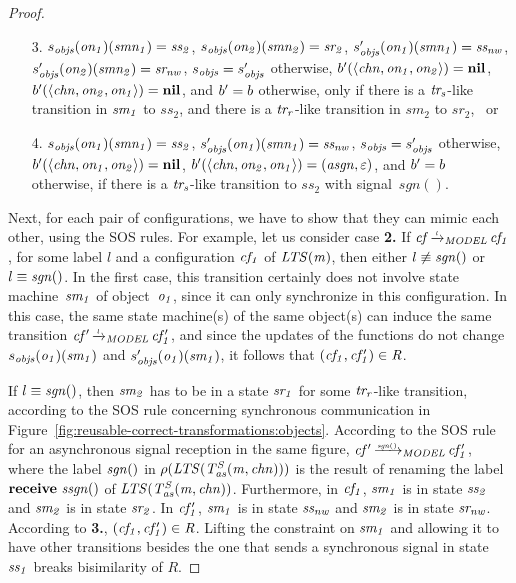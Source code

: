 \begin{proof}
\begin{enumerate}
\item[3.]
 $s_{\it{objs}}(\it{on_1})(\it{smn_1}) = \it{ss_2}$,
 $s_{\it{objs}}(\it{on_2})(\it{smn_2}) = \it{sr_2}$,
 $s_{\it{objs}}'(\it{on_1})(\it{smn_1}) = \it{ss_{nw}}$, \\
 $s_{\it{objs}}'(\it{on_2})(\it{smn_2}) = \it{sr_{nw}}$,
 $s_{\it{objs}} = s_{\it{objs}}'$ otherwise,
 $b'(\langle \it{chn}, \it{on_1}, \it{on_2}\rangle) = \mathbf{nil}$, \\
 $b'(\langle \it{chn}, \it{on_2}, \it{on_1}\rangle) = \mathbf{nil}$,
 and $b' = b$ otherwise,
 only if there is a $\it{tr_s}$-like transition in $\it{sm_1}$ to $ss_2$, and there is a $\it{tr_r}$-like transition in $sm_2$ to $sr_2$, \ or

\item[4.]
 $s_{\it{objs}}(\it{on_1})(\it{smn_1}) = \it{ss_2}$,
 $s_{\it{objs}}'(\it{on_1})(\it{smn_1}) = \it{ss_{nw}}$,
 $s_{\it{objs}} = s_{\it{objs}}'$ otherwise, \\
 $b'(\langle \it{chn}, \it{on_1}, \it{on_2}\rangle) = \mathbf{nil}$,
 $b'(\langle \it{chn}, \it{on_2}, \it{on_1}\rangle) = (\it{asgn}, \varepsilon)$,
 and $b' = b$ otherwise,
 if there is a $\it{tr_s}$-like transition to $ss_2$  with signal~$sgn()$.
\end{enumerate}
%
Next, for each pair of configurations, we have to show that they can mimic each other, using the SOS rules.
For example, let us consider case {\bf 2.} If $\it{cf} \TextModelRelation{l} \it{cf_1}$, for some label $l$ and a configuration $\it{cf_1}$ of $\it{LTS}(m)$, then either $l\not\equiv \it{sgn}()$ or $l\equiv \it{sgn}()$.
In the first case, this transition certainly does not involve state machine~$\it{sm_1}$ of object~$\it{o_1}$, since it can only synchronize in this configuration.
In this case, the same state machine(s) of the same object(s) can induce the same transition $\it{cf'} \TextModelRelation{l} \it{cf'_1}$, and since the updates of the functions do not change $s_{\it{objs}}(\it{o_1})(\it{sm_1})$ and $s_{\it{objs}}'(\it{o_1})(\it{sm_1})$, it follows that $(\it{cf_1}, \it{cf'_1}) \in R$.

If $l\equiv \it{sgn}()$, then $\it{sm_2}$ has to be in a state $\it{sr_1}$ for some $\it{tr_r}$-like transition, according to the SOS rule concerning synchronous communication in Figure~\ref{fig:reusable-correct-transformations:objects}.
According to the SOS rule for an asynchronous signal reception in the same figure, $\it{cf'} \TextModelRelation{\it{sgn}()} \it{cf'_1}$, where the label $\it{sgn}()$ in $\rho(\it{LTS}(T^S_{\it{as}}(m, \it{chn})))$ is the result of renaming the label ${\bf receive}~\it{ssgn()}$ of $\it{LTS}(T^S_{\it{as}}(m, \it{chn}))$.
Furthermore, in $\it{cf_1}$, $\it{sm_1}$ is in state $\it{ss_2}$ and $\it{sm_2}$ is in state $\it{sr_2}$.
In $\it{cf_1'}$, $\it{sm_1}$ is in state $\it{ss_{nw}}$ and $\it{sm_2}$ is in state $\it{sr_{nw}}$.
According to {\bf 3.}, $(\it{cf_1}, \it{cf_1'})\in R$.
Lifting the constraint on $\it{sm_1}$ and allowing it to have other transitions besides the one that sends a synchronous signal in state $\it{ss_1}$ breaks bisimilarity of $R$.


\end{proof}
